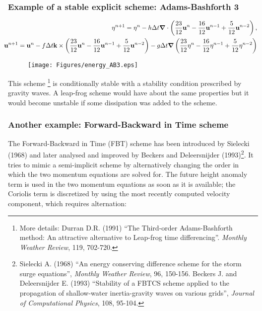 \subsubsection{Example of a stable explicit scheme: Adams-Bashforth 3}

\begin{eqnarray*}
	&&\hspace{-0.6cm} \eta^{n+1} = \eta^n - h \Delta t \bnabla \cdot \left(\frac{23}{12} \bu^n - \frac{16}{12} \bu^{n-1} + \frac{5}{12} \bu^{n-2}\right),
	\\
	&&\hspace{-0.6cm} \bu^{n+1} = \bu^n - f \Delta t \bk \times \left(\frac{23}{12} \bu^n - \frac{16}{12} \bu^{n-1} + \frac{5}{12} \bu^{n-2}\right) - g \Delta t \bnabla \left( \frac{23}{12} \eta^n - \frac{16}{12} \eta^{n-1} + \frac{5}{12} \eta^{n-2} \right)
\end{eqnarray*}

	
	\begin{figure}
		\texttt{[image: Figures/energy\_AB3.eps]}
	\end{figure}
\hfill
	
This scheme \footnote{More details: Durran D.R. (1991) ``The Third-order Adams-Bashforth method: An attractive alternative to Leap-frog time differencing''. \emph{Monthly Weather Review}, 119, 702-720.} is conditionally stable with a stability condition prescribed by gravity waves. A leap-frog scheme would have about the same properties but it would become unstable if some dissipation was added to the scheme. \\
	


\subsubsection{Another example: Forward-Backward in Time scheme}

The Forward-Backward in Time (FBT) scheme has been introduced by Sielecki (1968) and later analysed and improved by Beckers and Deleersnijder (1993)\footnote{Sielecki A. (1968) ``An energy conserving difference scheme for the storm surge equations'', \emph{Monthly Weather Review}, 96, 150-156. Beckers J. and Deleersnijder E. (1993) ``Stability of a FBTCS scheme applied to the propagation of shallow-water inertia-gravity waves on various grids'', \emph{Journal of Computational Physics}, 108, 95-104.}. It tries to mimic a semi-implicit scheme by alternatively changing the order in which the two momentum equations are solved for. The future height anomaly term is used in the two momentum equations as soon as it is available; the Coriolis term is discretized by using the most recently computed velocity component, which requires alternation:

